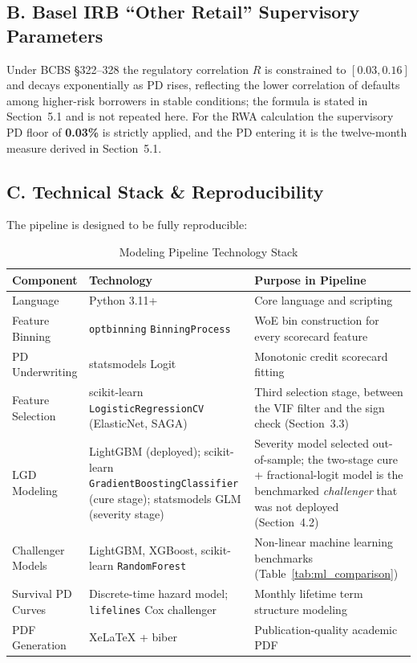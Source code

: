 \documentclass[11pt,a4paper]{article}
\begin{document}
\subsection{B. Basel IRB ``Other Retail'' Supervisory Parameters}
Under BCBS §322--328 the regulatory correlation $R$ is constrained to $[0.03, 0.16]$ and decays exponentially as PD rises, reflecting the lower correlation of defaults among higher-risk borrowers in stable conditions; the formula is stated in Section~5.1 and is not repeated here. For the RWA calculation the supervisory PD floor of \textbf{0.03\%} is strictly applied, and the PD entering it is the twelve-month measure derived in Section~5.1.

\subsection{C. Technical Stack \& Reproducibility}
The pipeline is designed to be fully reproducible:
\begin{table}[H]
\centering
\caption{Modeling Pipeline Technology Stack}
\label{tab:tech_stack}
\vspace{0.5em}
\begin{tabular}{p{3.2cm}p{4.0cm}p{6.8cm}}
\toprule
\textbf{Component} & \textbf{Technology} & \textbf{Purpose in Pipeline} \\
\midrule
Language & Python 3.11+ & Core language and scripting \\
Feature Binning & \texttt{optbinning} \texttt{BinningProcess} & WoE bin construction for every scorecard feature \\
PD Underwriting & statsmodels Logit & Monotonic credit scorecard fitting \\
Feature Selection & scikit-learn \texttt{LogisticRegressionCV} (ElasticNet, SAGA) & Third selection stage, between the VIF filter and the sign check (Section~3.3) \\
LGD Modeling & LightGBM (deployed); scikit-learn \texttt{GradientBoostingClassifier} (cure stage); statsmodels GLM (severity stage) & Severity model selected out-of-sample; the two-stage cure + fractional-logit model is the benchmarked \emph{challenger} that was not deployed (Section~4.2) \\
Challenger Models & LightGBM, XGBoost, scikit-learn \texttt{RandomForest} & Non-linear machine learning benchmarks (Table~\ref{tab:ml_comparison}) \\
Survival PD Curves & Discrete-time hazard model; \texttt{lifelines} Cox challenger & Monthly lifetime term structure modeling \\
PDF Generation & XeLaTeX + biber & Publication-quality academic PDF \\
\bottomrule
\end{tabular}
\end{table}
\end{document}
